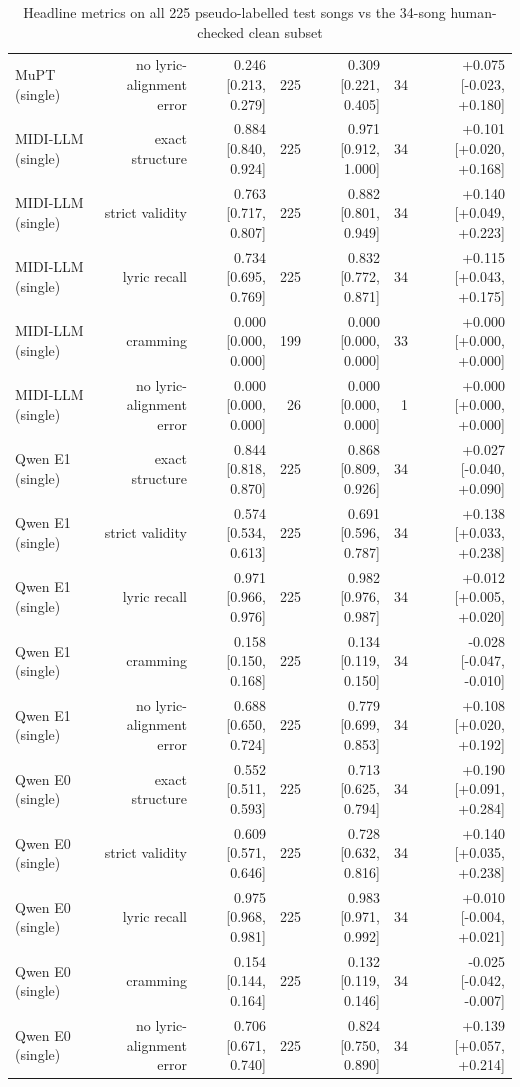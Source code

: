 \begin{table}[t]
\begin{tabular}{lrrrrrr}
MuPT (single) & no lyric-alignment error & 0.246 [0.213, 0.279] & 225 & 0.309 [0.221, 0.405] & 34 & +0.075 [-0.023, +0.180] \\
MIDI-LLM (single) & exact structure & 0.884 [0.840, 0.924] & 225 & 0.971 [0.912, 1.000] & 34 & +0.101 [+0.020, +0.168] \\
MIDI-LLM (single) & strict validity & 0.763 [0.717, 0.807] & 225 & 0.882 [0.801, 0.949] & 34 & +0.140 [+0.049, +0.223] \\
MIDI-LLM (single) & lyric recall & 0.734 [0.695, 0.769] & 225 & 0.832 [0.772, 0.871] & 34 & +0.115 [+0.043, +0.175] \\
MIDI-LLM (single) & cramming & 0.000 [0.000, 0.000] & 199 & 0.000 [0.000, 0.000] & 33 & +0.000 [+0.000, +0.000] \\
MIDI-LLM (single) & no lyric-alignment error & 0.000 [0.000, 0.000] & 26 & 0.000 [0.000, 0.000] & 1 & +0.000 [+0.000, +0.000] \\
Qwen E1 (single) & exact structure & 0.844 [0.818, 0.870] & 225 & 0.868 [0.809, 0.926] & 34 & +0.027 [-0.040, +0.090] \\
Qwen E1 (single) & strict validity & 0.574 [0.534, 0.613] & 225 & 0.691 [0.596, 0.787] & 34 & +0.138 [+0.033, +0.238] \\
Qwen E1 (single) & lyric recall & 0.971 [0.966, 0.976] & 225 & 0.982 [0.976, 0.987] & 34 & +0.012 [+0.005, +0.020] \\
Qwen E1 (single) & cramming & 0.158 [0.150, 0.168] & 225 & 0.134 [0.119, 0.150] & 34 & -0.028 [-0.047, -0.010] \\
Qwen E1 (single) & no lyric-alignment error & 0.688 [0.650, 0.724] & 225 & 0.779 [0.699, 0.853] & 34 & +0.108 [+0.020, +0.192] \\
Qwen E0 (single) & exact structure & 0.552 [0.511, 0.593] & 225 & 0.713 [0.625, 0.794] & 34 & +0.190 [+0.091, +0.284] \\
Qwen E0 (single) & strict validity & 0.609 [0.571, 0.646] & 225 & 0.728 [0.632, 0.816] & 34 & +0.140 [+0.035, +0.238] \\
Qwen E0 (single) & lyric recall & 0.975 [0.968, 0.981] & 225 & 0.983 [0.971, 0.992] & 34 & +0.010 [-0.004, +0.021] \\
Qwen E0 (single) & cramming & 0.154 [0.144, 0.164] & 225 & 0.132 [0.119, 0.146] & 34 & -0.025 [-0.042, -0.007] \\
Qwen E0 (single) & no lyric-alignment error & 0.706 [0.671, 0.740] & 225 & 0.824 [0.750, 0.890] & 34 & +0.139 [+0.057, +0.214] \\
\bottomrule
\end{tabular}
\caption{Headline metrics on all 225 pseudo-labelled test songs vs the 34-song human-checked clean subset}
\label{tab:annotation_noise}
\end{table}
